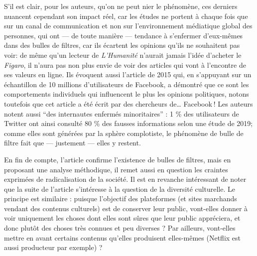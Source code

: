S’il est clair, pour les auteurs, qu’on ne peut nier le phénomène, ces derniers nuancent cependant son impact réel, car les études ne portent à chaque fois que sur un canal de communication et non sur l’environnement médiatique global des personnes, qui ont — de toute manière — tendance à s’enfermer d’eux-mêmes dans des bulles de filtres, car ils écartent les opinions qu’ils ne souhaitent pas voir: de même qu’un lecteur de \textit{L’Humanité} n’aurait jamais l’idée d’acheter le \textit{Figaro}, il n’aura pas non plus envie de voir des articles qui vont à l’encontre de ses valeurs en ligne. Ils évoquent aussi l’article de 2015 qui, en s’appuyant sur un échantillon de 10 millions d’utilisateurs de Facebook, a démontré que ce sont les comportements individuels qui influencent le plus les opinions politiques, notons toutefois que cet article a été écrit par des chercheurs de… Facebook ! Les auteurs notent aussi \enquote{des internautes enfermés minoritaires} : 1 \% des utilisateurs de Twitter ont ainsi consulté 80 \% des fausses informations selon une étude de 2019; comme elles sont générées par la sphère complotiste, le phénomène de bulle de filtre fait que — justement — elles y restent.

En fin de compte, l’article confirme l’existence de bulles de filtres, mais en proposant une analyse méthodique, il remet aussi en question les craintes exprimées de radicalisation de la société. Il est en revanche intéressant de noter que la suite de l’article s’intéresse à la question de la diversité culturelle. Le principe est similaire : puisque l’objectif des plateformes (et sites marchands vendant des contenus culturels) est de conserver leur public, vont-elles donner à voir uniquement les choses dont elles sont sûres que leur public appréciera, et donc plutôt des choses très connues et peu diverses ? Par ailleurs, vont-elles mettre en avant certains contenus qu’elles produisent elles-mêmes (Netflix est aussi producteur par exemple) ?

